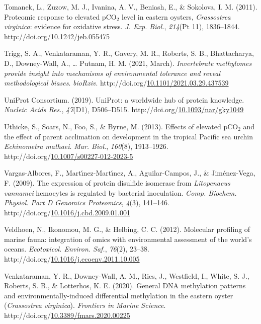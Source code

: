 \documentclass [11pt, proquest] {uwthesis}[2015/03/03]
\newlength{\cslhangindent}
\newenvironment{CSLReferences}%
{\setlength{\parindent}{0pt}%
\everypar{\setlength{\hangindent}{\cslhangindent}}\ignorespaces}%
{\par}
\begin{document}
\begin{CSLReferences}{1}{0}
\leavevmode\hypertarget{ref-Tomanek2011}{}%
Tomanek, L., Zuzow, M. J., Ivanina, A. V., Beniash, E., \& Sokolova, I. M. (2011). {Proteomic response to elevated {pCO\(_2\)} level in eastern oysters, \emph{Crassostrea virginica}: evidence for oxidative stress}. \emph{J. Exp. Biol.}, \emph{214}(Pt 11), 1836--1844. http://doi.org/\href{https://doi.org/10.1242/jeb.055475}{10.1242/jeb.055475}

\leavevmode\hypertarget{ref-Trigg2021}{}%
Trigg, S. A., Venkataraman, Y. R., Gavery, M. R., Roberts, S. B., Bhattacharya, D., Downey-Wall, A., \ldots{} Putnam, H. M. (2021, March). \emph{{Invertebrate methylomes provide insight into mechanisms of environmental tolerance and reveal methodological biases}}. \emph{bioRxiv}. http://doi.org/\href{https://doi.org/10.1101/2021.03.29.437539}{10.1101/2021.03.29.437539}

\leavevmode\hypertarget{ref-UniProt_Consortium2019}{}%
UniProt Consortium. (2019). {UniProt: a worldwide hub of protein knowledge}. \emph{Nucleic Acids Res.}, \emph{47}(D1), D506--D515. http://doi.org/\href{https://doi.org/10.1093/nar/gky1049}{10.1093/nar/gky1049}

\leavevmode\hypertarget{ref-Uthicke2013}{}%
Uthicke, S., Soars, N., Foo, S., \& Byrne, M. (2013). {Effects of elevated {pCO\(_2\)} and the effect of parent acclimation on development in the tropical Pacific sea urchin \emph{Echinometra mathaei}}. \emph{Mar. Biol.}, \emph{160}(8), 1913--1926. http://doi.org/\href{https://doi.org/10.1007/s00227-012-2023-5}{10.1007/s00227-012-2023-5}

\leavevmode\hypertarget{ref-Vargas-Albores2009}{}%
Vargas-Albores, F., Martı́nez-Martı́nez, A., Aguilar-Campos, J., \& Jiménez-Vega, F. (2009). {The expression of protein disulfide isomerase from \emph{Litopenaeus vannamei} hemocytes is regulated by bacterial inoculation}. \emph{Comp. Biochem. Physiol. Part D Genomics Proteomics}, \emph{4}(3), 141--146. http://doi.org/\href{https://doi.org/10.1016/j.cbd.2009.01.001}{10.1016/j.cbd.2009.01.001}

\leavevmode\hypertarget{ref-Veldhoen2012}{}%
Veldhoen, N., Ikonomou, M. G., \& Helbing, C. C. (2012). {Molecular profiling of marine fauna: integration of omics with environmental assessment of the world's oceans}. \emph{Ecotoxicol. Environ. Saf.}, \emph{76}(2), 23--38. http://doi.org/\href{https://doi.org/10.1016/j.ecoenv.2011.10.005}{10.1016/j.ecoenv.2011.10.005}

\leavevmode\hypertarget{ref-Venkataraman2020}{}%
Venkataraman, Y. R., Downey-Wall, A. M., Ries, J., Westfield, I., White, S. J., Roberts, S. B., \& Lotterhos, K. E. (2020). {General DNA methylation patterns and environmentally-induced differential methylation in the eastern oyster (\emph{Crassostrea virginica})}. \emph{Frontiers in Marine Science}. http://doi.org/\href{https://doi.org/10.3389/fmars.2020.00225}{10.3389/fmars.2020.00225}


\end{CSLReferences}
\end{document}
